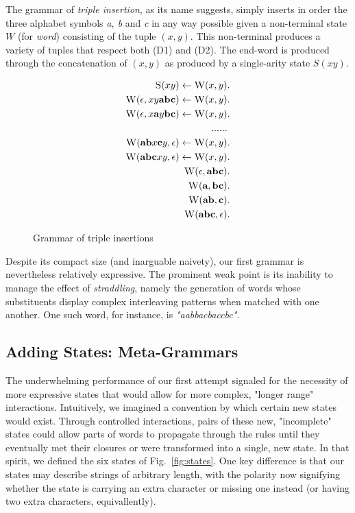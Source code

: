 \documentclass[nonatbib,numbers,10pt]{sigplanconf}
\newcommand{\w}[1]{\textit{"#1"}}
\newcommand\s{\textsc}
\begin{document}
The grammar of \textit{triple insertion}, as its name suggests, simply inserts in order the three alphabet symbols \textit{a, b} and \textit{c} in any way possible given a non-terminal state $W$ (for \textit{word}) consisting of the tuple $(x,y)$. This non-terminal produces a variety of tuples that respect both (D1) and (D2). The end-word is produced through the concatenation of $(x,y)$ as produced by a single-arity state $S(xy)$.
\begin{figure}[h!]
\begin{align}
\setcounter{equation}{0}
\s{S}(xy) \leftarrow \s{W}(x,y)&. \\
\s{W}(\epsilon, xy\textbf{abc}) \leftarrow \s{W}(x,y)&. \\
\s{W}(\epsilon, x\textbf{a}y\textbf{bc}) \leftarrow \s{W}(x,y)&. \\
...... \nonumber \\
\setcounter{equation}{59}
\s{W}(\textbf{ab}x\textbf{c}y, \epsilon) \leftarrow \s{W}(x,y)&. \\
\s{W}(\textbf{abc}xy, \epsilon) \leftarrow \s{W}(x,y)&. \\
\s{W}(\epsilon, \textbf{abc})&. \\
\s{W}(\textbf{a}, \textbf{bc})&. \\
\s{W}(\textbf{ab}, \textbf{c})&. \\
\s{W}(\textbf{abc}, \epsilon)&.
\end{align}
\caption{Grammar of triple insertions}
\end{figure}

Despite its compact size (and inarguable naivety), our first grammar is nevertheless relatively expressive. The prominent weak point is its inability to manage the effect of \textit{straddling}, namely the generation of words whose substituents display complex interleaving patterns when matched with one another. One such word, for instance, is \w{aabbacbaccbc}.
\subsection{Adding States: Meta-Grammars}
The underwhelming performance of our first attempt signaled for the necessity of more expressive states that would allow for more complex, "longer range" interactions. Intuitively, we imagined a convention by which certain new states would exist. Through controlled interactions, pairs of these new, "incomplete" states could allow parts of words to propagate through the rules until they eventually met their closures or were transformed into a single, new state. In that spirit, we defined the six states of Fig.~\ref{fig:states}. One key difference is that our states may describe strings of arbitrary length, with the polarity now signifying whether the state is carrying an extra character or missing one instead (or having two extra characters, equivallently).
\end{document}
